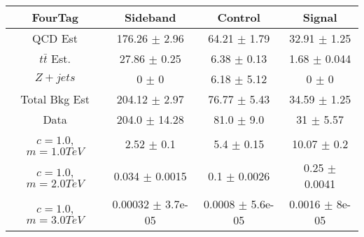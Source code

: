 \begin{footnotesize} 
\begin{tabular}{c|c|c|c} 
FourTag & Sideband & Control & Signal \\ 
\hline\hline 
QCD Est & 176.26 $\pm$ 2.96 & 64.21 $\pm$ 1.79 & 32.91 $\pm$ 1.25\\ 
$t\bar{t}$ Est.  & 27.86 $\pm$ 0.25 & 6.38 $\pm$ 0.13 & 1.68 $\pm$ 0.044\\ 
$Z+jets$ & 0 $\pm$ 0 & 6.18 $\pm$ 5.12 & 0 $\pm$ 0\\ 
Total Bkg Est & 204.12 $\pm$ 2.97 & 76.77 $\pm$ 5.43 & 34.59 $\pm$ 1.25\\ 
Data & 204.0 $\pm$ 14.28 & 81.0 $\pm$ 9.0 & 31 $\pm$ 5.57 \\ 
$c=1.0$,$m=1.0TeV$ & 2.52 $\pm$ 0.1 & 5.4 $\pm$ 0.15 & 10.07 $\pm$ 0.2\\ 
$c=1.0$,$m=2.0TeV$ & 0.034 $\pm$ 0.0015 & 0.1 $\pm$ 0.0026 & 0.25 $\pm$ 0.0041\\ 
$c=1.0$,$m=3.0TeV$ & 0.00032 $\pm$ 3.7e-05 & 0.0008 $\pm$ 5.6e-05 & 0.0016 $\pm$ 8e-05\\ 
\hline\hline 
\end{tabular} 
\end{footnotesize} 
\newline 
